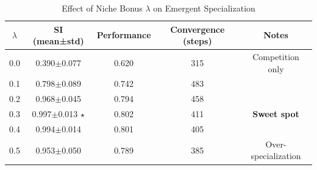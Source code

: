 
\begin{table}[h]
\centering
\caption{Effect of Niche Bonus $\lambda$ on Emergent Specialization}
\label{tab:lambda_ablation}
\begin{tabular}{ccccc}
\toprule
$\lambda$ & SI (mean±std) & Performance & Convergence (steps) & Notes \\
\midrule
0.0 & 0.390$\pm$0.077  & 0.620 & 315 & Competition only \\
0.1 & 0.798$\pm$0.089  & 0.742 & 483 &  \\
0.2 & 0.968$\pm$0.045  & 0.794 & 458 &  \\
0.3 & 0.997$\pm$0.013 $\star$ & 0.802 & 411 & \textbf{Sweet spot} \\
0.4 & 0.994$\pm$0.014  & 0.801 & 405 &  \\
0.5 & 0.953$\pm$0.050  & 0.789 & 385 & Over-specialization \\

\bottomrule
\end{tabular}
\end{table}
